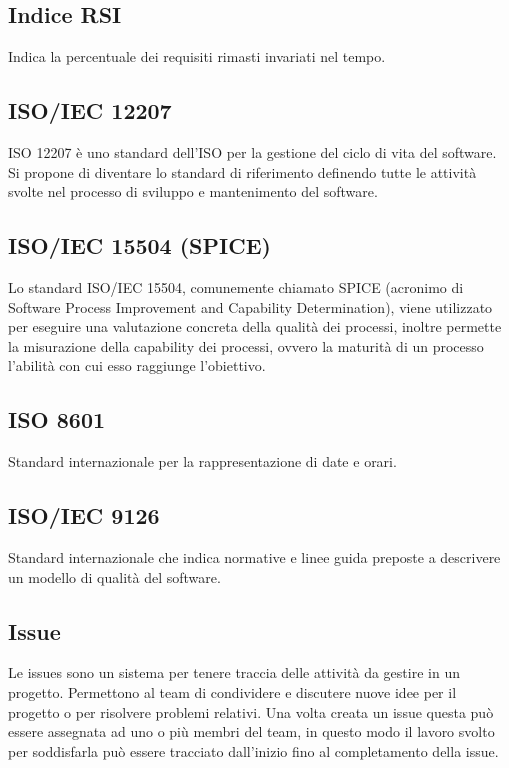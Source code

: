 	\subsection{Indice RSI}
	Indica la percentuale dei requisiti rimasti invariati nel tempo.
	
	\subsection{ISO/IEC 12207}
		ISO 12207 è uno standard dell'ISO per la gestione del ciclo di vita del software. Si propone di diventare lo standard di riferimento definendo tutte le attività svolte nel processo di sviluppo e mantenimento del software.
	\subsection{ISO/IEC 15504 (SPICE)}
	Lo standard ISO/IEC 15504, comunemente chiamato SPICE (acronimo di Software Process Improvement and Capability Determination), viene utilizzato per eseguire una valutazione concreta della qualità dei processi, inoltre permette la misurazione della capability dei processi, ovvero la maturità
	di un processo l’abilità con cui esso raggiunge l’obiettivo.

	\subsection{ISO 8601}
	Standard internazionale per la rappresentazione di date e orari.
	
	\subsection{ISO/IEC 9126}
	Standard internazionale che indica normative e linee guida preposte a descrivere un modello di qualità del software.
	
	\subsection{Issue}
	Le issues sono un sistema per tenere traccia delle attività da gestire in un progetto. Permettono al team di condividere e discutere nuove idee per il progetto o per risolvere problemi relativi. Una volta creata un issue questa può essere assegnata ad uno o più membri del team, in questo modo il lavoro svolto per soddisfarla può essere tracciato dall'inizio fino al completamento della issue.
	
